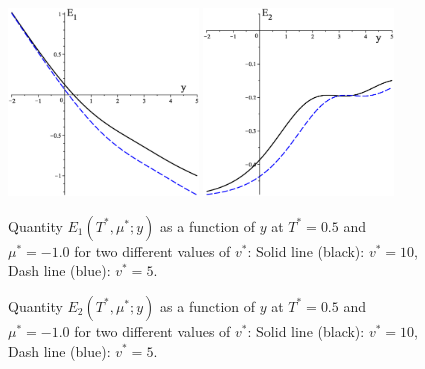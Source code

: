 \documentclass[12pt]{article}
\numberwithin{equation}{section}
\begin{document}
		
	\begin{figure}[htbp]
		\includegraphics[width=0.45\textwidth,angle=0]{images/E1_vs_y2}
		\hfill
		\includegraphics[width=0.45\textwidth,angle=0]{images/E2_vs_y}
		\\
		\parbox{0.45\textwidth}{\caption{\label{fig:E1_vs_y} Quantity $E_1(T^*,\mu^*;y)$ as a function of $y$ at $T^*=0.5$ and $\mu^*=-1.0$ for two different values of $v^*$: Solid line (black): $v^* = 10$, Dash line (blue): $v^* = 5$.}}
		\hfill
		\parbox{0.45\textwidth}{\caption{\label{fig:E2_vs_y} Quantity $E_2(T^*,\mu^*;y)$ as a function of $y$ at $T^*=0.5$ and $\mu^*=-1.0$ for two different values of $v^*$: Solid line (black): $v^* = 10$, Dash line (blue): $v^* = 5$.}}
	\end{figure}
	
\end{document}
